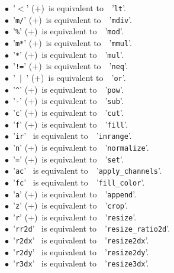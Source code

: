 \documentclass[a4paper,10.5pt,twoside]{book}
\newcommand{\Ca}[1]{\textcolor{ca}{#1}}
\begin{document}
$\bullet$~'\texttt{\Ca{$<$}}' (+)~is equivalent to~~'\texttt{\Ca{lt}}'.\\
$\bullet$~'\texttt{\Ca{m/}}' (+)~is equivalent to~~'\texttt{\Ca{mdiv}}'.\\
$\bullet$~'\texttt{\Ca{\%}}' (+)~is equivalent to~~'\texttt{\Ca{mod}}'.\\
$\bullet$~'\texttt{\Ca{m*}}' (+)~is equivalent to~~'\texttt{\Ca{mmul}}'.\\
$\bullet$~'\texttt{\Ca{*}}' (+)~is equivalent to~~'\texttt{\Ca{mul}}'.\\
$\bullet$~'\texttt{\Ca{!=}}' (+)~is equivalent to~~'\texttt{\Ca{neq}}'.\\
$\bullet$~'\texttt{\Ca{~$|$~}}' (+)~is equivalent to~~'\texttt{\Ca{or}}'.\\
$\bullet$~'\texttt{\Ca{\textasciicircum }}' (+)~is equivalent to~~'\texttt{\Ca{pow}}'.\\
$\bullet$~'\texttt{\Ca{-}}' (+)~is equivalent to~~'\texttt{\Ca{sub}}'.\\
$\bullet$~'\texttt{\Ca{c}}' (+)~is equivalent to~~'\texttt{\Ca{cut}}'.\\
$\bullet$~'\texttt{\Ca{f}}' (+)~is equivalent to~~'\texttt{\Ca{fill}}'.\\
$\bullet$~'\texttt{\Ca{ir}}' ~is equivalent to~~'\texttt{\Ca{inrange}}'.\\
$\bullet$~'\texttt{\Ca{n}}' (+)~is equivalent to~~'\texttt{\Ca{normalize}}'.\\
$\bullet$~'\texttt{\Ca{=}}' (+)~is equivalent to~~'\texttt{\Ca{set}}'.\\
$\bullet$~'\texttt{\Ca{ac}}' ~is equivalent to~~'\texttt{\Ca{apply\_channels}}'.\\
$\bullet$~'\texttt{\Ca{fc}}' ~is equivalent to~~'\texttt{\Ca{fill\_color}}'.\\
$\bullet$~'\texttt{\Ca{a}}' (+)~is equivalent to~~'\texttt{\Ca{append}}'.\\
$\bullet$~'\texttt{\Ca{z}}' (+)~is equivalent to~~'\texttt{\Ca{crop}}'.\\
$\bullet$~'\texttt{\Ca{r}}' (+)~is equivalent to~~'\texttt{\Ca{resize}}'.\\
$\bullet$~'\texttt{\Ca{rr2d}}' ~is equivalent to~~'\texttt{\Ca{resize\_ratio2d}}'.\\
$\bullet$~'\texttt{\Ca{r2dx}}' ~is equivalent to~~'\texttt{\Ca{resize2dx}}'.\\
$\bullet$~'\texttt{\Ca{r2dy}}' ~is equivalent to~~'\texttt{\Ca{resize2dy}}'.\\
$\bullet$~'\texttt{\Ca{r3dx}}' ~is equivalent to~~'\texttt{\Ca{resize3dx}}'.\\
\end{document}
